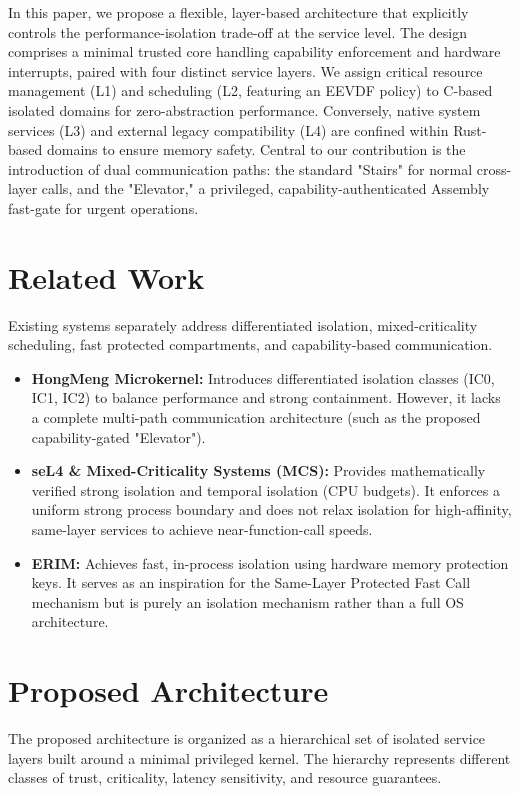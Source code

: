 \documentclass[10pt, a4paper, twocolumn]{article}
\begin{document}
In this paper, we propose a flexible, layer-based architecture that explicitly controls the performance-isolation trade-off at the service level. The design comprises a minimal trusted core handling capability enforcement and hardware interrupts, paired with four distinct service layers. We assign critical resource management (L1) and scheduling (L2, featuring an EEVDF policy) to C-based isolated domains for zero-abstraction performance. Conversely, native system services (L3) and external legacy compatibility (L4) are confined within Rust-based domains to ensure memory safety. Central to our contribution is the introduction of dual communication paths: the standard "Stairs" for normal cross-layer calls, and the "Elevator," a privileged, capability-authenticated Assembly fast-gate for urgent operations.

\section{Related Work}
Existing systems separately address differentiated isolation, mixed-criticality scheduling, fast protected compartments, and capability-based communication.

\begin{itemize}
    \item \textbf{HongMeng Microkernel:} Introduces differentiated isolation classes (IC0, IC1, IC2) to balance performance and strong containment. However, it lacks a complete multi-path communication architecture (such as the proposed capability-gated "Elevator").
    \item \textbf{seL4 \& Mixed-Criticality Systems (MCS):} Provides mathematically verified strong isolation and temporal isolation (CPU budgets). It enforces a uniform strong process boundary and does not relax isolation for high-affinity, same-layer services to achieve near-function-call speeds.
    \item \textbf{ERIM:} Achieves fast, in-process isolation using hardware memory protection keys. It serves as an inspiration for the Same-Layer Protected Fast Call mechanism but is purely an isolation mechanism rather than a full OS architecture.
\end{itemize}

\section{Proposed Architecture}
The proposed architecture is organized as a hierarchical set of isolated service layers built around a minimal privileged kernel. The hierarchy represents different classes of trust, criticality, latency sensitivity, and resource guarantees.
\end{document}
